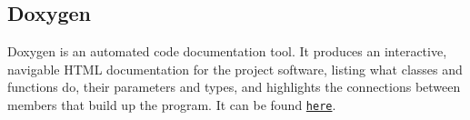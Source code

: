 \subsection*{Doxygen}

Doxygen is an automated code documentation tool. It produces an interactive, navigable H\+T\+ML documentation for the project software, listing what classes and functions do, their parameters and types, and highlights the connections between members that build up the program. It can be found \href{https://itsbelinda.github.io/ENG5220-2020-Team13/doc/html/index.html}{\tt here}. 